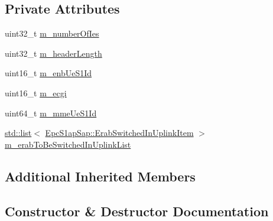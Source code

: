 \subsection*{Private Attributes}
\begin{DoxyCompactItemize}
\item 
uint32\+\_\+t \hyperlink{classns3_1_1EpcS1APPathSwitchRequestAcknowledgeHeader_a393eb3652a4fa93567b1310c95a24c34}{m\+\_\+number\+Of\+Ies}
\item 
uint32\+\_\+t \hyperlink{classns3_1_1EpcS1APPathSwitchRequestAcknowledgeHeader_ab55a364f9ad48c5f1d3010054c9cb6d8}{m\+\_\+header\+Length}
\item 
uint16\+\_\+t \hyperlink{classns3_1_1EpcS1APPathSwitchRequestAcknowledgeHeader_a1f2e10e79ee3cda4079736bf8d35114e}{m\+\_\+enb\+Ue\+S1\+Id}
\item 
uint16\+\_\+t \hyperlink{classns3_1_1EpcS1APPathSwitchRequestAcknowledgeHeader_a513cd2cb4a04bb44128045a7e1538c0f}{m\+\_\+ecgi}
\item 
uint64\+\_\+t \hyperlink{classns3_1_1EpcS1APPathSwitchRequestAcknowledgeHeader_a5e3e51c30edadc0174d3e17f1dfc35f6}{m\+\_\+mme\+Ue\+S1\+Id}
\item 
\hyperlink{openflow-interface_8h_afd9bcfa176617760671b67580f536fa7}{std\+::list}$<$ \hyperlink{structns3_1_1EpcS1apSap_1_1ErabSwitchedInUplinkItem}{Epc\+S1ap\+Sap\+::\+Erab\+Switched\+In\+Uplink\+Item} $>$ \hyperlink{classns3_1_1EpcS1APPathSwitchRequestAcknowledgeHeader_a6a39047dd91a079998d2e261d4b4c5e0}{m\+\_\+erab\+To\+Be\+Switched\+In\+Uplink\+List}
\end{DoxyCompactItemize}
\subsection*{Additional Inherited Members}


\subsection{Constructor \& Destructor Documentation}
